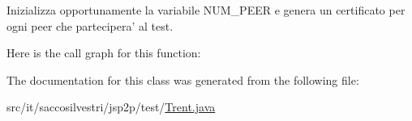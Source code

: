 \-Inizializza opportunamente la variabile \-N\-U\-M\-\_\-\-P\-E\-E\-R e genera un certificato per ogni peer che partecipera' al test. 



\-Here is the call graph for this function\-:




\-The documentation for this class was generated from the following file\-:\begin{DoxyCompactItemize}
\item 
src/it/saccosilvestri/jsp2p/test/\hyperlink{_trent_8java}{\-Trent.\-java}\end{DoxyCompactItemize}
